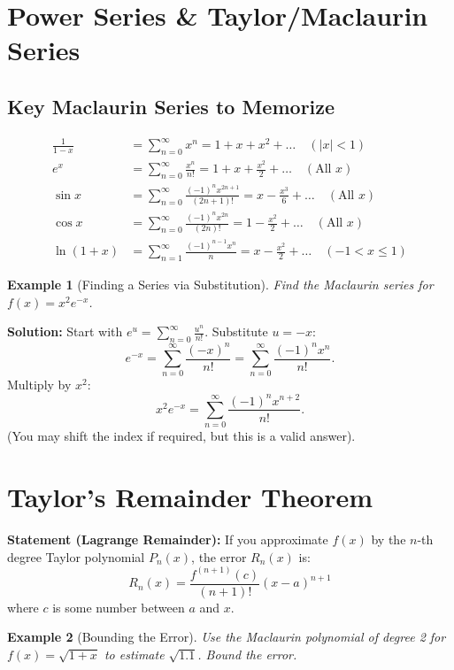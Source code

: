 \documentclass[11pt]{article}
\newtheorem{example}{Example}[section]
\begin{document}
\section{Power Series \& Taylor/Maclaurin Series}

\subsection{Key Maclaurin Series to Memorize}
\begin{align*}
    \frac{1}{1-x} &= \sum_{n=0}^\infty x^n = 1 + x + x^2 + \dots \quad (|x| < 1) \\
    e^x &= \sum_{n=0}^\infty \frac{x^n}{n!} = 1 + x + \frac{x^2}{2} + \dots \quad (\text{All } x) \\
    \sin x &= \sum_{n=0}^\infty \frac{(-1)^n x^{2n+1}}{(2n+1)!} = x - \frac{x^3}{6} + \dots \quad (\text{All } x) \\
    \cos x &= \sum_{n=0}^\infty \frac{(-1)^n x^{2n}}{(2n)!} = 1 - \frac{x^2}{2} + \dots \quad (\text{All } x) \\
    \ln(1+x) &= \sum_{n=1}^\infty \frac{(-1)^{n-1} x^n}{n} = x - \frac{x^2}{2} + \dots \quad (-1 < x \le 1)
\end{align*}

\begin{example}[Finding a Series via Substitution]
Find the Maclaurin series for $f(x) = x^2 e^{-x}$.
\end{example}

\textbf{Solution:}
Start with $e^u = \sum_{n=0}^\infty \frac{u^n}{n!}$.
Substitute $u = -x$:
\[
e^{-x} = \sum_{n=0}^\infty \frac{(-x)^n}{n!} = \sum_{n=0}^\infty \frac{(-1)^n x^n}{n!}.
\]
Multiply by $x^2$:
\[
x^2 e^{-x} = \sum_{n=0}^\infty \frac{(-1)^n x^{n+2}}{n!}.
\]
(You may shift the index if required, but this is a valid answer).

\section{Taylor's Remainder Theorem}

\textbf{Statement (Lagrange Remainder):} If you approximate $f(x)$ by the $n$-th degree Taylor polynomial $P_n(x)$, the error $R_n(x)$ is:
\[
R_n(x) = \frac{f^{(n+1)}(c)}{(n+1)!} (x-a)^{n+1}
\]
where $c$ is some number between $a$ and $x$.

\begin{example}[Bounding the Error]
Use the Maclaurin polynomial of degree 2 for $f(x) = \sqrt{1+x}$ to estimate $\sqrt{1.1}$. Bound the error.
\end{example}
\end{document}
